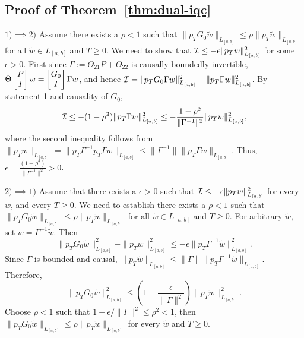 
\subsection{Proof of Theorem~\ref{thm:dual-iqc}}\label{proof:dual-iqc}
$1)\implies2)$ Assume there exists a $\rho<1$ such that
$\|p_T G_0\tilde w\|_{L_{[a,b]}}\leq\rho\|p_T \tilde w\|_{L_{[a,b]}}$
for all $\tilde{w}\in L_{[a,b]}$ and $T\geq0$. We need to show that
$\mathcal{I}\leq-\epsilon\|p_Tw\|_{L_{[a,b]}}^2$ for some $\epsilon>0$. First since $\Gamma:=\Theta_{21}P+\Theta_{22}$ is causally boundedly invertible,
$\Theta\begin{bmatrix}P\\I\end{bmatrix}w=\begin{bmatrix}G_0\\I\end{bmatrix}\Gamma w$, and hence
$\mathcal{I}=\|p_TG_0\Gamma  w\|_{L_{[a,b]}}^2-\|p_T\Gamma  w\|_{L_{[a,b]}}^2$. By statement 1 and causality of $G_0$,
\[
    \mathcal{I}\leq-(1-\rho^2)\|p_T\Gamma w\|_{L_{[a,b]}}^2
    \leq-\frac{1-\rho^2}{\|\Gamma^{-1}\|^2}\|p_Tw\|_{L_{[a,b]}}^2,
\]
where the second inequality follows from
$\|p_Tw\|_{L_{[a,b]}}=\|p_T\Gamma^{-1}p_T\Gamma w\|_{L_{[a,b]}}
\leq\|\Gamma^{-1}\|\|p_T\Gamma w\|_{L_{[a,b]}}$. Thus, $\epsilon=\frac{(1-\rho^2)}{\|\Gamma^{-1}\|^2}>0$.

$2)\implies1)$ Assume that there exists a $\epsilon > 0$ such that $\mathcal{I}\leq-\epsilon\|p_Tw\|_{L_{[a,b]}}^2$ for every $w$, and every $T\geq0$. 
We need to establish there exists a $\rho<1$ such that
$\|p_T G_0\tilde w\|_{L_{[a,b]}}\leq\rho\|p_T \tilde w\|_{L_{[a,b]}}$
for all $\tilde{w}\in L_{[a,b]}$ and $T\geq0$. For arbitrary $\tilde w$, 
set $w=\Gamma^{-1}\tilde w$. Then
\[
    \|p_TG_0\tilde w\|_{L_{[a,b]}}^2-\|p_T\tilde w\|_{L_{[a,b]}}^2
    \leq-\epsilon\|p_T\Gamma^{-1}\tilde w\|_{L_{[a,b]}}^2.
\]
Since $\Gamma$ is bounded and causal,
$\|p_T\tilde w\|_{L_{[a,b]}}\leq
\|\Gamma\|\|p_T\Gamma^{-1}\tilde w\|_{L_{[a,b]}}$. Therefore,
\[
    \|p_TG_0\tilde w\|_{L_{[a,b]}}^2
    \leq\left(1-\frac{\epsilon}{\|\Gamma\|^2}\right)
    \|p_T\tilde w\|_{L_{[a,b]}}^2.
\]
Choose $\rho<1$ such that $1-\epsilon/\|\Gamma\|^2\leq\rho^2<1$, 
then $\|p_TG_0\tilde w\|_{L_{[a,b]}}\leq\rho\|p_T\tilde w\|_{L_{[a,b]}}$
for every $\tilde w$ and $T\geq0$.

